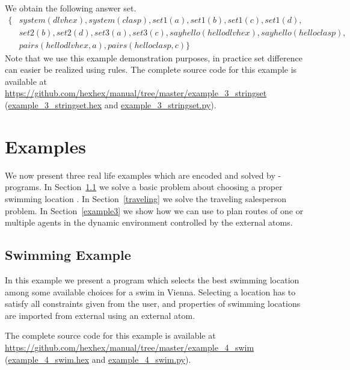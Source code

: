 \documentclass[a4paper, titlepage]{article}
\newcommand{\mi}[1]{\mathit{#1}}
\newcommand{\examplelink}[1]{\url{https://github.com/hexhex/manual/tree/master/#1}}
\newcommand{\exampledownloadlink}[2]{\href{https://github.com/hexhex/manual/raw/master/#1}{#2}}
\begin{document}
\begin{exmp}
\noindent
We obtain the following answer set.
\begin{align*}
  \{ & \mi{system(dlvhex),system(clasp),set1(a),set1(b),set1(c),set1(d),} \\
  & \mi{set2(b),set2(d),set3(a),set3(c),sayhello(hellodlvhex),sayhello(helloclasp),} \\
  & \mi{pairs(hellodlvhex,a),pairs(helloclasp,c)} \}
\end{align*}
%
Note that we use this example demonstration purposes,
in practice set difference can easier be realized using rules.
%
The complete source code for this example is available at
\examplelink{example_3_stringset}
(\exampledownloadlink{example_3_stringset/example_3_stringset.hex}{example\_3\_stringset.hex} and
\exampledownloadlink{example_3_stringset/example_3_stringset.py}{example\_3\_stringset.py}).
\end{exmp}

\section{Examples}
\label{sec:examples}
We now present three real life examples  
which are encoded and solved by \hex-programs.
In Section~\ref{sec:swimming} we solve a basic problem
about choosing a proper swimming location \cite{efikrs2015}.
In Section~\ref{traveling} we solve the traveling salesperson problem.
In Section~\ref{example3} we show how we can use \dlvhex{}
to plan routes of one or multiple agents in the dynamic 
environment controlled by the external atoms.

\subsection{Swimming Example}
\label{sec:swimming}
In this example we present a program which selects  
the best swimming location among some available choices 
for a swim in Vienna. Selecting a location has to 
satisfy all constraints given from the user,
and properties of swimming locations are imported from external
using an external atom.

The complete source code for this example is available at
\examplelink{example_4_swim}
(\exampledownloadlink{example_4_swim/example_4_swim.hex}{example\_4\_swim.hex}
and 
\exampledownloadlink{example_4_swim/example_4_swim.py}{example\_4\_swim.py}).
\end{document}
